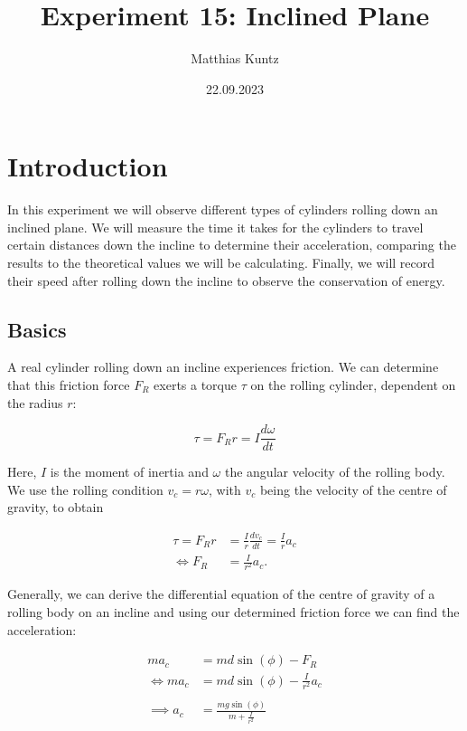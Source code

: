 \documentclass{article}
\title{Experiment 15: Inclined Plane}
\author{Matthias Kuntz}
\date{22.09.2023}
\begin{document}
\maketitle

\section{Introduction}

In this experiment we will observe different types of cylinders rolling down an inclined plane. We will measure the time it takes for the cylinders to travel certain distances down the incline to determine their acceleration, comparing the results to the theoretical values we will be calculating. Finally, we will record their speed after rolling down the incline to observe the conservation of energy.  

\subsection{Basics}

A real cylinder rolling down an incline experiences friction. We can determine that this friction force $F_R$  exerts a torque $\tau$ on the rolling cylinder, dependent on the radius $r$:

\begin{equation}
    \tau = F_R r = I \frac{d\omega}{dt}
    \label{eq:1}
\end{equation}

Here, $I$ is the moment of inertia and $\omega$ the angular velocity of the rolling body. We use the rolling condition $v_c =r \omega$, with $v_c$ being the velocity of the centre of gravity, to obtain

\begin{equation}
    \begin{split}
        \tau = F_R r &= \frac{I}{r} \frac{dv_c}{dt} = \frac{I}{r} a_c \\
        \iff F_R &= \frac{I}{r^2} a_c.
    \end{split}
    \label{eq:2}
\end{equation}

Generally, we can derive the differential equation of the centre of gravity of a rolling body on an incline and using our determined friction force we can find the acceleration:

\begin{equation}
    \begin{split}
        ma_c &= md \sin{(\phi)} - F_R \\
        \iff ma_c &= md \sin{(\phi)} - \frac{I}{r^2} a_c \\ \\
        \implies a_c &= \frac{mg \sin{(\phi)}}{m + \frac{I}{r^2}}
    \end{split}
    \label{eq:3}
\end{equation}
\end{document}
